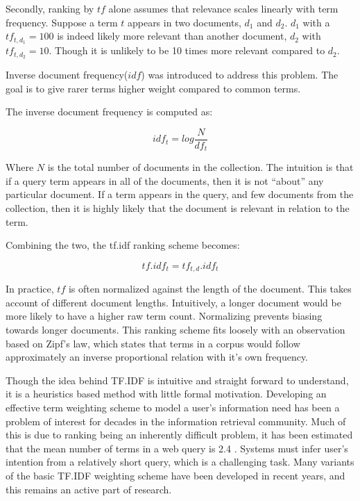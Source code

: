 Secondly, ranking by $tf$ alone assumes that relevance scales linearly with term frequency. Suppose a term $t$ appears in two documents, $d_1$ and $d_2$.  $d_1$ with a $tf_{t,d_1}=100$ is indeed likely more relevant than another document, $d_2$ with $tf_{t,d_2}=10$. Though it is unlikely to be 10 times more relevant compared to $d_2$. 

Inverse document frequency($idf$) was introduced to address this problem. The goal is to give rarer terms higher weight compared to common terms.

The inverse document frequency is computed as:

\begin{equation}
    idf_t = log \frac{N}{df_t}
\end{equation}

Where $N$ is the total number of documents in the collection.  The intuition is that if a query term appears in all of the documents, then it is not ``about'' any particular document. If a term appears in the query, and few documents from the collection, then it is highly likely that the document is relevant in relation to the term. 

Combining the two, the tf.idf ranking scheme becomes:

\begin{equation}
     tf.idf_t = tf_{t,d}. idf_t
\end{equation}

In practice, $tf$ is often normalized against the length of the document. This takes account of different document lengths. Intuitively, a longer document would be more likely to have a higher raw term count. Normalizing prevents biasing towards longer documents. This ranking scheme fits loosely with an observation based on Zipf's law\cite{li1992random}, which states that terms in a corpus would follow approximately an inverse proportional relation with it's own frequency. 

Though the idea behind TF.IDF is intuitive and straight forward to understand, it is a heuristics based method with little formal motivation. Developing an effective term weighting scheme to model a user's information need has been a problem of interest for decades in the information retrieval community. Much of this is due to ranking being an inherently difficult problem, it has been estimated that the mean number of terms in a web query is 2.4 \cite{spink2001searching}. Systems must infer user's intention from a relatively short query, which is a challenging task. Many variants of the basic TF.IDF weighting scheme have been developed in recent years, and this remains an active part of research.


